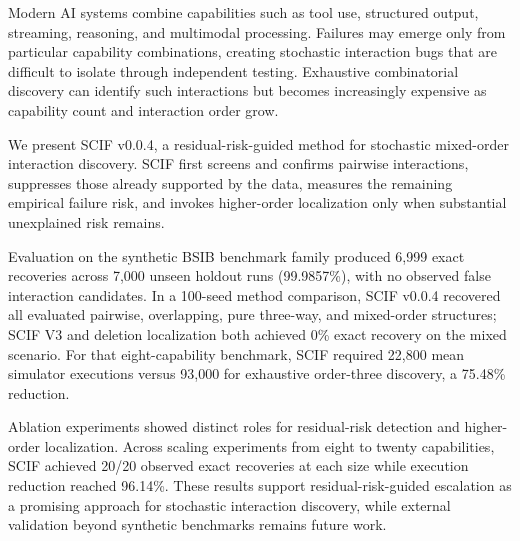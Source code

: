 Modern AI systems combine capabilities such as tool use, structured output, streaming, reasoning, and multimodal processing. Failures may emerge only from particular capability combinations, creating stochastic interaction bugs that are difficult to isolate through independent testing. Exhaustive combinatorial discovery can identify such interactions but becomes increasingly expensive as capability count and interaction order grow.

We present SCIF v0.0.4, a residual-risk-guided method for stochastic mixed-order interaction discovery. SCIF first screens and confirms pairwise interactions, suppresses those already supported by the data, measures the remaining empirical failure risk, and invokes higher-order localization only when substantial unexplained risk remains.

Evaluation on the synthetic BSIB benchmark family produced 6,999 exact recoveries across 7,000 unseen holdout runs (99.9857\%), with no observed false interaction candidates. In a 100-seed method comparison, SCIF v0.0.4 recovered all evaluated pairwise, overlapping, pure three-way, and mixed-order structures; SCIF V3 and deletion localization both achieved 0\% exact recovery on the mixed scenario. For that eight-capability benchmark, SCIF required 22,800 mean simulator executions versus 93,000 for exhaustive order-three discovery, a 75.48\% reduction.

Ablation experiments showed distinct roles for residual-risk detection and higher-order localization. Across scaling experiments from eight to twenty capabilities, SCIF achieved 20/20 observed exact recoveries at each size while execution reduction reached 96.14\%. These results support residual-risk-guided escalation as a promising approach for stochastic interaction discovery, while external validation beyond synthetic benchmarks remains future work.

